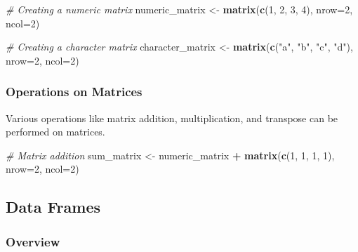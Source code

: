 \documentclass[
]{book}
\newenvironment{Shaded}{\begin{snugshade}}{\end{snugshade}}
\newcommand{\AttributeTok}[1]{\textcolor[rgb]{0.13,0.29,0.53}{#1}}
\newcommand{\CommentTok}[1]{\textcolor[rgb]{0.56,0.35,0.01}{\textit{#1}}}
\newcommand{\DecValTok}[1]{\textcolor[rgb]{0.00,0.00,0.81}{#1}}
\newcommand{\FunctionTok}[1]{\textcolor[rgb]{0.13,0.29,0.53}{\textbf{#1}}}
\newcommand{\NormalTok}[1]{#1}
\newcommand{\OtherTok}[1]{\textcolor[rgb]{0.56,0.35,0.01}{#1}}
\newcommand{\SpecialCharTok}[1]{\textcolor[rgb]{0.81,0.36,0.00}{\textbf{#1}}}
\newcommand{\StringTok}[1]{\textcolor[rgb]{0.31,0.60,0.02}{#1}}
\begin{document}
\begin{Shaded}
\begin{Highlighting}[]
\CommentTok{\# Creating a numeric matrix}
\NormalTok{numeric\_matrix }\OtherTok{\textless{}{-}} \FunctionTok{matrix}\NormalTok{(}\FunctionTok{c}\NormalTok{(}\DecValTok{1}\NormalTok{, }\DecValTok{2}\NormalTok{, }\DecValTok{3}\NormalTok{, }\DecValTok{4}\NormalTok{), }\AttributeTok{nrow=}\DecValTok{2}\NormalTok{, }\AttributeTok{ncol=}\DecValTok{2}\NormalTok{)}

\CommentTok{\# Creating a character matrix}
\NormalTok{character\_matrix }\OtherTok{\textless{}{-}} \FunctionTok{matrix}\NormalTok{(}\FunctionTok{c}\NormalTok{(}\StringTok{"a"}\NormalTok{, }\StringTok{"b"}\NormalTok{, }\StringTok{"c"}\NormalTok{, }\StringTok{"d"}\NormalTok{), }\AttributeTok{nrow=}\DecValTok{2}\NormalTok{, }\AttributeTok{ncol=}\DecValTok{2}\NormalTok{)}
\end{Highlighting}
\end{Shaded}

\hypertarget{operations-on-matrices}{%
\subsubsection*{Operations on Matrices}\label{operations-on-matrices}}

Various operations like matrix addition, multiplication, and transpose can be performed on matrices.

\begin{Shaded}
\begin{Highlighting}[]
\CommentTok{\# Matrix addition}
\NormalTok{sum\_matrix }\OtherTok{\textless{}{-}}\NormalTok{ numeric\_matrix }\SpecialCharTok{+} \FunctionTok{matrix}\NormalTok{(}\FunctionTok{c}\NormalTok{(}\DecValTok{1}\NormalTok{, }\DecValTok{1}\NormalTok{, }\DecValTok{1}\NormalTok{, }\DecValTok{1}\NormalTok{), }\AttributeTok{nrow=}\DecValTok{2}\NormalTok{, }\AttributeTok{ncol=}\DecValTok{2}\NormalTok{)}
\end{Highlighting}
\end{Shaded}

\hypertarget{data-frames}{%
\subsection*{Data Frames}\label{data-frames}}

\hypertarget{overview-4}{%
\subsubsection*{Overview}\label{overview-4}}
\end{document}
